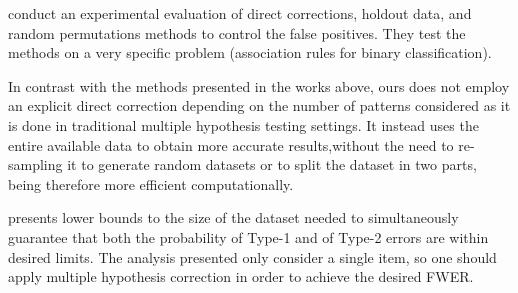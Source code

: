 \iffalse
\citet{Hanhijarvi11} presents a direct adjustment method to bound
the FWER while taking into consideration the actual number of hypotheses to be
tested. The dataset is resampled (using the method
from~\citep{GionisMMT07}) in order to adjust the $p$-values in such a way that
the FWER is within the desired bounds.  This can be done in the setting
of~\citep{Hanhijarvi11} thanks to the limited generative model taken into
consideration, which assumes that the items in it appear independently from
each other in the transactions.
\fi


\citet{LiuZW11} conduct an experimental evaluation of  direct corrections, holdout data,
and random permutations methods to
control the false positives. They test the methods on a very specific problem
(association rules for binary classification). 

In contrast with the methods presented in the works above,
ours does not employ an explicit direct correction depending on the number of
patterns considered as it is  done in traditional multiple hypothesis testing
settings. %
It instead uses the entire available data to obtain more accurate
results,without the need to re-sampling it to generate random datasets or to
split the dataset in two parts, being therefore more efficient computationally.

\iffalse
\citet{JacquemontFS09} presents lower bounds to the size of the
dataset needed to simultaneously guarantee that both the probability of Type-1
and of Type-2 errors are within desired limits. The analysis presented only
consider a single item, so one should apply multiple hypothesis correction in
order to achieve the desired FWER.

\iffalse
{\bf XXX:} To me, this paper
looks flawed because they do derive all the bounds for a single pattern and do
not apply a union bound at the end, which seems necessary to me. They do not
even try to argue that it is not needed, so I guess they overlooked this\ldots
\fi

